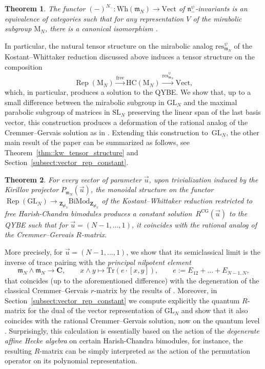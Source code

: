 \documentclass[pdftex]{sigma}
\numberwithin{equation}{section}
\newtheorem{thmx}{Theorem}
\newcommand{\CG}{\mathrm{CG}}
\newcommand{\Tr}{\mathrm{Tr}}
\newcommand{\C}{\mathbf{C}}
\newcommand{\Z}{\mathbf{Z}}
\newcommand{\GL}{\mathrm{GL}}
\newcommand{\n}{\mathfrak{n}}
\newcommand{\m}{\mathfrak{m}}
\newcommand{\BiMod}[2]{{}_{#1}\mathrm{BiMod}_{#2}}
\newcommand{\free}{\mathrm{free}}
\DeclareMathOperator{\Rep}{Rep}
\newcommand{\res}{\mathrm{res}}
\newcommand{\Vect}{\mathrm{Vect}}
\newcommand{\gl}{\mathfrak{gl}}
\begin{document}
	\begin{thmx}
		The functor $(-)^{N_-} \colon \mathrm{Wh}(\m_N) \rightarrow \Vect$ of $\n_-^{\psi}$-invariants is an equivalence of categories such that for any representation $V$ of the mirabolic subgroup $\mathrm{M}_N$, there is a canonical isomorphism
	\smash{$
		\bigl(\n_-^{\psi} \backslash V \otimes \mathrm{U}(\m_N)\bigr)^{N_-} \cong V$}.
	\end{thmx}
	
	In particular, the natural tensor structure on the mirabolic analog $\res_{\m_N}^{\psi}$ of the Kostant--Whittaker reduction discussed above induces a tensor structure on the composition
	\[
	\Rep(\mathrm{M}_N) \xrightarrow{\free} \mathrm{HC}(\mathrm{M}_N) \xrightarrow{\res_{\m_N}^{\psi}} \Vect,
	\]
	which, in particular, produces a solution to the QYBE. We show that, up to a small difference between the mirabolic subgroup in $\GL_N$ and the maximal parabolic subgroup of matrices in $\mathrm{SL}_N$ preserving the linear span of the last basis vector, this construction produces a deformation of the rational analog of the Cremmer--Gervais solution as in \cite{EndelmanHodges}. Extending this construction to~$\GL_N$, the other main result of the paper can be summarized as follows, see Theorem~\ref{thm::kw_tensor_structure} and Section~\ref{subsect:vector_rep_constant}.
	
	\begin{thmx}
		For every vector of parameter $\vec{u}$, upon trivialization induced by the Kirillov projector $P_{\m_N}(\vec{u})$, the monoidal structure on the functor $\Rep(\GL_N) \rightarrow \BiMod{\Z_{\gl_N}}{\Z_{\gl_N}}$ of the Kostant--Whittaker reduction restricted to free Harish-Chandra bimodules produces a constant solution~$R^{\CG}(\vec{u})$ to the QYBE such that for $\vec{u} = (N-1,\dots,1)$, it coincides with the rational analog of the Cremmer--Gervais $R$-matrix.
	\end{thmx}
	
	More precisely, for $\vec{u} = (N-1,\dots,1)$, we show that its semiclassical limit is the inverse of trace pairing with the \emph{principal nilpotent element}
	\[
	\m_N \wedge \m_N \rightarrow \C, \qquad x \wedge y \mapsto \Tr(e\cdot[x,y]), \qquad e := E_{12} + \dots + E_{N-1,N},
	\]
	that coincides (up to the aforementioned difference) with the degeneration of the classical Cremmer--Gervais $r$-matrix by the results of \cite{GerstenhaberGiaquinto}. Moreover, in Section~\ref{subsect:vector_rep_constant} we compute explicitly the quantum $R$-matrix for the dual of the vector representation of $\GL_N$ and show that it also coincides with the rational Cremmer--Gervais solution, now on the quantum level \cite{EndelmanHodges}. Surprisingly, this calculation is essentially based on the action of the \emph{degenerate affine Hecke algebra} on certain Harish-Chandra bimodules, for instance, the resulting $R$-matrix can be simply interpreted as the action of the permutation operator on its polynomial representation.
	
\end{document}
